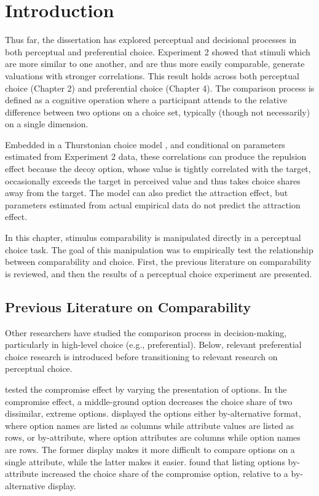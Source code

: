\section{Introduction}
Thus far, the dissertation has explored perceptual and decisional processes in both perceptual and preferential choice. Experiment 2 showed that stimuli which are more similar to one another, and are thus more easily comparable, generate valuations with stronger correlations. This result holds across both perceptual choice (Chapter 2) and preferential choice (Chapter 4). The comparison process is defined as a cognitive operation where a participant attends to the relative difference between two options on a choice set, typically (though not necessarily) on a single dimension. 

Embedded in a Thurstonian choice model \parencite{thurstone1927law}, and conditional on parameters estimated from Experiment 2 data, these correlations can produce the repulsion effect \parencite{spektorWhenGoodLooks2018b,simonson2014vices} because the decoy option, whose value is tightly correlated with the target, occasionally exceeds the target in perceived value and thus takes choice shares away from the target. The model can also predict the attraction effect, but parameters estimated from actual empirical data do not predict the attraction effect.

In this chapter, stimulus comparability is manipulated directly in a perceptual choice task. The goal of this manipulation was to empirically test the relationship between comparability and choice. First, the previous literature on comparability is reviewed, and then the results of a perceptual choice experiment are presented.

\subsection{Previous Literature on Comparability}

Other researchers have studied the comparison process in decision-making, particularly in high-level choice (e.g., preferential). Below, relevant preferential choice research is introduced before transitioning to relevant research on perceptual choice. 

\textcite{changWhichCompromiseOption2008} tested the compromise effect by varying the presentation of options. In the compromise effect, a middle-ground option decreases the choice share of two dissimilar, extreme options. \textcite{changWhichCompromiseOption2008} displayed the options either by-alternative format, where option names are listed as columns while attribute values are listed as rows, or by-attribute, where option attributes are columns while option names are rows. The former display makes it more difficult to compare options on a single attribute, while the latter makes it easier. \textcite{changWhichCompromiseOption2008} found that listing options by-attribute increased the choice share of the compromise option, relative to a by-alternative display. 

